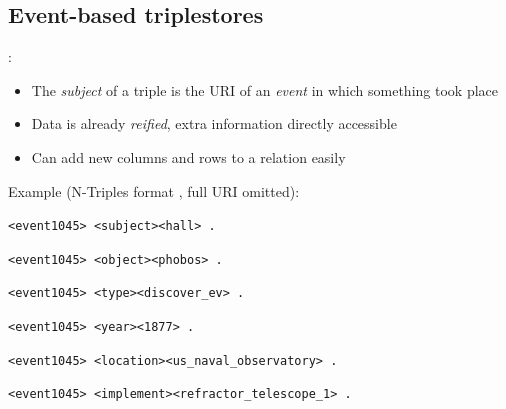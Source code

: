 \documentclass[logoontitle,tabu,supertabular,aspectratio=43]{preney-uwindsor-beamer}
\begin{document}
    \subsection{Event-based triplestores}
    \begin{frame}{\insertsection: \insertsubsection}
        \begin{itemize}
            \item The {\em subject} of a triple is the URI of an \textit{event} in which something took place
            \item Data is already {\em reified}, extra information directly accessible
            \item Can add new columns and rows to a relation easily
        \end{itemize}

        Example (N-Triples format \cite{w3cntriples}, full URI omitted):
        \begin{block}{}
            \hspace{5em}\texttt{<event1045> <subject>\phantom{qqq}<hall> .}

            \hspace{5em}\texttt{<event1045> <object>\phantom{qqqq}<phobos> .}

            \hspace{5em}\texttt{<event1045> <type>\phantom{qqqqqq}<discover\_ev> .}

            \hspace{5em}\texttt{<event1045> <year>\phantom{qqqqqq}<1877> .}

            \hspace{5em}\texttt{<event1045> <location>\phantom{qq}<us\_naval\_observatory> .}

            \hspace{5em}\texttt{<event1045> <implement>\phantom{q}<refractor\_telescope\_1> .}
        \end{block}

    \end{frame}
\end{document}
